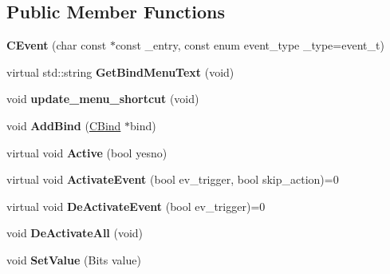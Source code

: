 \subsection*{Public Member Functions}
\begin{DoxyCompactItemize}
\item 
\hypertarget{classCEvent_a1dccd12980b4a85ca70ca6d77d631b45}{{\bfseries C\-Event} (char const $\ast$const \-\_\-entry, const enum event\-\_\-type \-\_\-type=event\-\_\-t)}\label{classCEvent_a1dccd12980b4a85ca70ca6d77d631b45}

\item 
\hypertarget{classCEvent_adcc4bad114bb2f135e354d018cbe1d8c}{virtual std\-::string {\bfseries Get\-Bind\-Menu\-Text} (void)}\label{classCEvent_adcc4bad114bb2f135e354d018cbe1d8c}

\item 
\hypertarget{classCEvent_a0ebaf9dbda3dc862fb61e21280dd987f}{void {\bfseries update\-\_\-menu\-\_\-shortcut} (void)}\label{classCEvent_a0ebaf9dbda3dc862fb61e21280dd987f}

\item 
\hypertarget{classCEvent_a2665ebd0551c2b437b02d521f1c7adda}{void {\bfseries Add\-Bind} (\hyperlink{classCBind}{C\-Bind} $\ast$bind)}\label{classCEvent_a2665ebd0551c2b437b02d521f1c7adda}

\item 
\hypertarget{classCEvent_a8643a8541e23ed77a63869dd11780c83}{virtual void {\bfseries Active} (bool yesno)}\label{classCEvent_a8643a8541e23ed77a63869dd11780c83}

\item 
\hypertarget{classCEvent_a1b7abcd9c0ecedc29de42017e3cfef13}{virtual void {\bfseries Activate\-Event} (bool ev\-\_\-trigger, bool skip\-\_\-action)=0}\label{classCEvent_a1b7abcd9c0ecedc29de42017e3cfef13}

\item 
\hypertarget{classCEvent_a525574fb193f9e50402a8fd5028b9b06}{virtual void {\bfseries De\-Activate\-Event} (bool ev\-\_\-trigger)=0}\label{classCEvent_a525574fb193f9e50402a8fd5028b9b06}

\item 
\hypertarget{classCEvent_a633d83fd6d210a7b6a517754548eee11}{void {\bfseries De\-Activate\-All} (void)}\label{classCEvent_a633d83fd6d210a7b6a517754548eee11}

\item 
\hypertarget{classCEvent_aaa253031798af461119b830d079e8225}{void {\bfseries Set\-Value} (Bits value)}\label{classCEvent_aaa253031798af461119b830d079e8225}


\end{DoxyCompactItemize}
